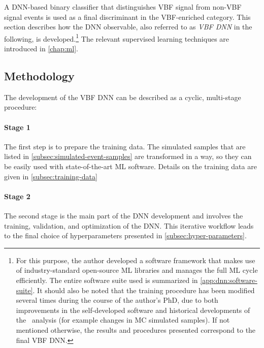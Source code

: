 A DNN-based binary classifier that distinguishes VBF signal from non-VBF signal events is used as a final discriminant in the VBF-enriched \TwoJet category.
This section describes how the DNN observable, also referred to as \emph{VBF DNN} in the following, is developed.\footnote{For this purpose, the author developed a software framework that makes use of industry-standard open-source ML libraries and manages the full ML cycle efficiently.
The entire software suite used is summarized in \cref{app:dnn:software-suite}.
It should also be noted that the training procedure has been modified several times during the course of the author's PhD, due to both improvements in the self-developed software and historical developments of the \HWW\ analysis (for example changes in MC simulated samples). If not mentioned otherwise, the results and procedures presented correspond to the final VBF DNN.}
The relevant supervised learning techniques are introduced in \cref{chap:ml}.



\subsection{Methodology}
The development of the VBF DNN can be described as a cyclic, multi-stage procedure:

\paragraph{Stage 1}
The first step is to prepare the training data.
The simulated samples that are listed in \cref{subsec:simulated-event-samples} are transformed in a way, so they can be easily used with state-of-the-art ML software. Details on the training data are given in \cref{subsec:training-data}

\paragraph{Stage 2}
The second stage is the main part of the DNN development and involves the training, validation, and optimization of the DNN.
This iterative workflow leads to the final choice of hyperparameters presented in \cref{subsec:hyper-parameters}.

